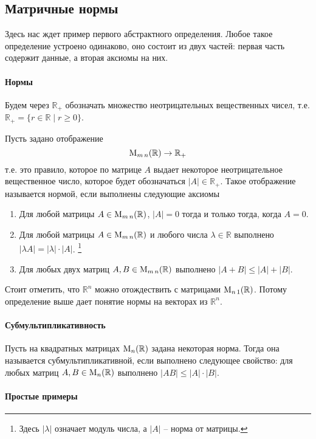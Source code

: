 \subsection{Матричные нормы}

Здесь нас ждет пример первого абстрактного определения.
Любое такое определение устроено одинаково, оно состоит из двух частей: первая часть содержит данные, а вторая аксиомы на них.

\paragraph{Нормы}

Будем через $\mathbb R_+$ обозначать множество неотрицательных вещественных чисел, т.е. $\mathbb R_+ = \{r\in \mathbb R\mid r \geqslant 0\}$.

Пусть задано отображение 
\[
\operatorname{M}_{m\,n}(\mathbb R)\to \mathbb R_+
\]
т.е. это правило, которое по матрице $A$ выдает некоторое неотрицательное вещественное число, которое будет обозначаться $|A|\in\mathbb R_+$.
Такое отображение называется нормой, если выполнены следующие аксиомы
\begin{enumerate}
\item Для любой матрицы $A\in\operatorname{M}_{m\,n}(\mathbb R)$, $|A| = 0$ тогда и только тогда, когда $A = 0$.

\item Для любой матрицы $A\in\operatorname{M}_{m\,n}(\mathbb R)$ и любого числа $\lambda\in\mathbb R$ выполнено $|\lambda A| = |\lambda| \cdot |A|$.%
\footnote{Здесь $|\lambda|$ означает модуль числа, а $|A|$ -- норма от матрицы.}

\item Для любых двух матриц $A, B \in\operatorname{M}_{m\,n}(\mathbb R)$ выполнено $|A + B|\leqslant |A| + |B|$.
\end{enumerate}


Стоит отметить, что $\mathbb R^n$ можно отождествить с матрицами $\operatorname{M}_{n\,1}(\mathbb R)$.
Потому определение выше дает понятие нормы на векторах из $\mathbb R^n$.

\paragraph{Субмультипликативность}

Пусть на квадратных матрицах $\operatorname{M}_{n}(\mathbb R)$ задана некоторая норма.
Тогда она называется субмультипликативной, если выполнено следующее свойство: для любых матриц $A, B\in\operatorname{M}_{n}(\mathbb R)$ выполнено $|AB|\leqslant |A|\cdot |B|$.

\paragraph{Простые примеры}

